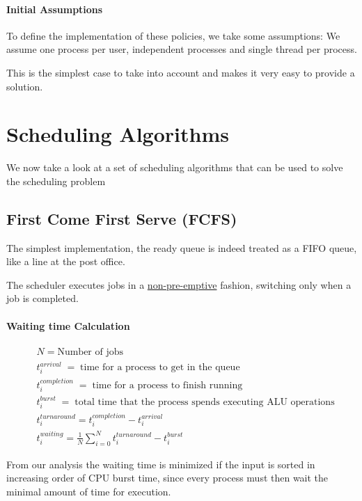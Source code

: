 \documentclass[openright, twoside]{report}
\theoremstyle{definition}
\theoremstyle{example}
\begin{document}
			\paragraph{Initial Assumptions}To define the implementation of these policies, we take some assumptions:
			We assume one process per user, independent processes and single thread 
			per process.

			This is the simplest case to take into account and makes it very easy to provide a solution.

	\section{Scheduling Algorithms}
	\label{sec:scheduling_alg}
		We now take a look at a set of scheduling algorithms that can be used to solve 
		the scheduling problem 
		\subsection{First Come First Serve (FCFS)}
			\label{ssec:FCFS}
			The simplest implementation, the ready queue is indeed treated as a 
			FIFO queue, like a line at the post office.

			The scheduler executes jobs in a \hyperref[par:preem]{non-pre-emptive} fashion, switching 
			only when a job is completed.

			\paragraph{Waiting time Calculation}
				\begin{align*}
					&N = \text{Number of jobs} \\
					&t^{arrival}_i \; = \; \text{time for a process to get in the queue}\\
					&t^{completion}_i \; = \; \text{time for a process to finish running} \\
					&t^{burst}_i \; = \; \text{total time that the process spends executing ALU operations} \\
					&t^{turnaround}_i = t^{completion}_i - t^{arrival}_i \\
					&t^{waiting}_i = \frac{1}{N}\sum^N_{i=0}{t^{turnaround}_i - t^{burst}_i}
				\end{align*}

			From our analysis the waiting time is minimized if the input is sorted in increasing
			order of CPU burst time, since every process must then wait the minimal
			amount of time for execution. 
\end{document}
